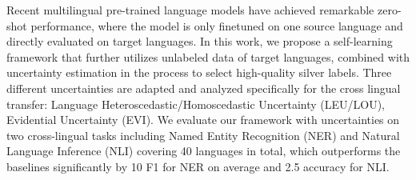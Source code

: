 Recent multilingual pre-trained language models have achieved remarkable zero-shot performance, where the model is only finetuned on one source language and directly evaluated on target languages. In this work, we propose a self-learning framework that further utilizes unlabeled data of target languages, combined with uncertainty estimation in the process to select high-quality silver labels. Three different uncertainties are adapted and analyzed specifically for the cross lingual transfer: Language Heteroscedastic/Homoscedastic Uncertainty (LEU/LOU), Evidential  Uncertainty (EVI). We evaluate our framework with uncertainties on two cross-lingual tasks including Named Entity Recognition (NER) and Natural Language Inference (NLI) covering 40 languages in total, which outperforms the baselines significantly by 10 F1 for NER on average and 2.5 accuracy for NLI.
